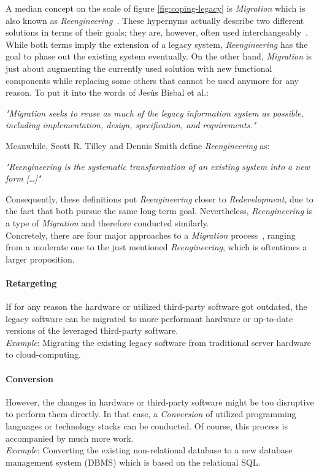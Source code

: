 \documentclass[12pt,a4paper,twoside]{report}
\begin{document}
A median concept on the scale of figure \ref{fig:coping-legacy} is \textit{Migration}
which is also known as \textit{Reengineering}~\cite{tilley-perspectives-reengineering}.
These hypernyms actually describe two different solutions in terms of their goals;
they are, however, often used interchangeably~\cite{bisbal-legacy-issues}.
While both terms imply the extension of a legacy system, \textit{Reengineering}
has the goal to phase out the existing system eventually.
On the other hand, \textit{Migration} is just about augmenting the currently used
solution with new functional components while replacing some others that cannot be used anymore
for any reason. To put it into the words of Jesús Bisbal et al.:
\begin{displayquote}
\emph{"Migration seeks to reuse as much of the legacy information system as possible,
including implementation, design, specification, and requirements."}~\cite{bisbal-legacy-issues}
\end{displayquote}
Meanwhile, Scott R. Tilley and Dennis Smith define \textit{Reengineering} as:
\begin{displayquote}
\emph{"Reengineering is the systematic transformation of an existing system
into a new form […]"}~\cite{tilley-perspectives-reengineering}
\end{displayquote}
Consequently, these definitions put \textit{Reengineering} closer to \textit{Redevelopment},
due to the fact that both pursue the same long-term goal.
Nevertheless, \textit{Reengineering} is a type of \textit{Migration} and
therefore conducted similarly.\\
Concretely, there are four major approaches to a \textit{Migration}
process~\cite{malinova-legacy-techniques, seacord-modernizing-legacy},
ranging from a moderate one to the just mentioned \textit{Reengineering},
which is oftentimes a larger proposition.

\paragraph{Retargeting}
If for any reason the hardware or utilized third-party software got outdated,
the legacy software can be migrated to more performant hardware or
up-to-date versions of the leveraged third-party software.\\
\textit{Example}: Migrating the existing legacy software from traditional server
hardware to cloud-computing.

\paragraph{Conversion}
However, the changes in hardware or third-party software might be too disruptive
to perform them directly. In that case, a \textit{Conversion} of utilized
programming languages or technology stacks can be conducted.
Of course, this process is accompanied by much more work.\\
\textit{Example}: Converting the existing non-relational database to a
new database management system (DBMS) which is based on the relational SQL.
\end{document}
